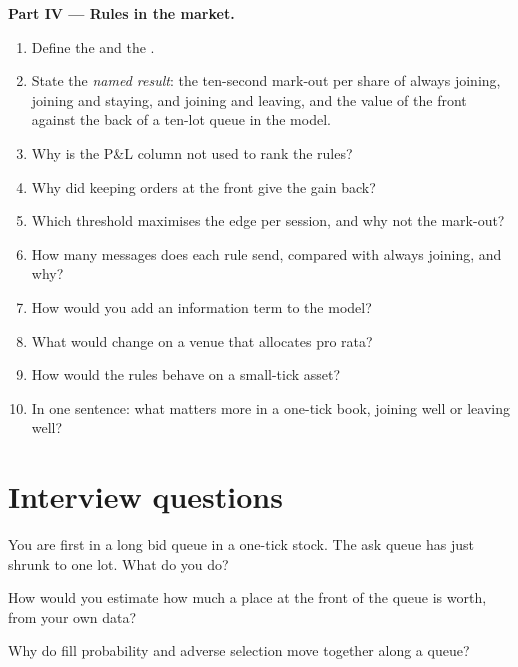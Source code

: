 \begin{problem}
\medskip\noindent\textbf{Part IV --- Rules in the market.}
\begin{enumerate}[resume]
\item Define the  and the .
\item State the \emph{named result}: the ten-second mark-out per share of always joining, joining and staying, and joining and leaving, and the value
of the front against the back of a ten-lot queue in the model.
\item Why is the P\&L column not used to rank the rules?
\item Why did keeping orders at the front give the gain back?
\item Which threshold maximises the edge per session, and why not the mark-out?
\item How many messages does each rule send, compared with always joining, and why?
\item How would you add an information term to the model?
\item What would change on a venue that allocates pro rata?
\item How would the rules behave on a small-tick asset?
\item In one sentence: what matters more in a one-tick book, joining well or leaving well?
\end{enumerate}
\end{problem}

\section{Interview questions}

\begin{interviewq}\label{iq:hf:queue-reactive-models-and-large-tick-assets:1}
You are first in a long bid queue in a one-tick stock. The ask queue has just shrunk to one lot. What do you do?
\end{interviewq}

\begin{interviewq}\label{iq:hf:queue-reactive-models-and-large-tick-assets:2}
How would you estimate how much a place at the front of the queue is worth, from your own data?
\end{interviewq}

\begin{interviewq}\label{iq:hf:queue-reactive-models-and-large-tick-assets:3}
Why do fill probability and adverse selection move together along a queue?
\end{interviewq}

